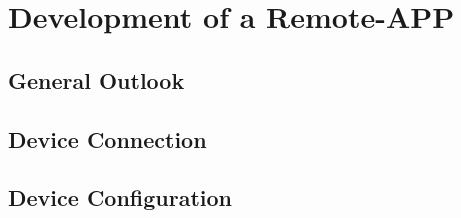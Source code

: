 \section{Development of a Remote-APP}\label{sec:FrontenddDev}
\subsection{General Outlook}
\subsection{Device Connection}
\subsection{Device Configuration}
